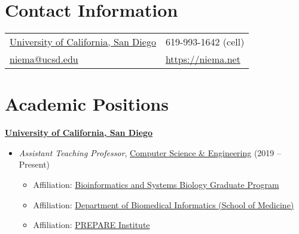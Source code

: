 \documentclass[margin,line]{res}
\begin{document}
\begin{resume}

\section{\sc Contact Information}
\vspace{.05in}
\begin{tabular}{@{}p{2.75in}p{2in}}
\href{http://www.ucsd.edu/}{University of California, San Diego} & 619-993-1642 (cell)\\
\href{mailto:niema@ucsd.edu}{niema@ucsd.edu} & \href{https://niema.net}{https://niema.net}\\
\end{tabular}

\section{\sc Academic Positions}
{\bf \href{http://www.ucsd.edu/}{University of California, San Diego}}\\
\vspace*{-.1in}
\begin{itemize}
\item[] \hspace*{-2mm} \textit{Assistant Teaching Professor}, \href{http://www.cs.ucsd.edu/}{Computer Science \& Engineering} (2019 -- Present)
\begin{itemize}
\item Affiliation: \href{http://bioinformatics.ucsd.edu/}{Bioinformatics and Systems Biology Graduate Program}
\item Affiliation: \href{http://dbmi.ucsd.edu/}{Department of Biomedical Informatics (School of Medicine)}
\item Affiliation: \href{https://prepare.ucsd.edu/}{PREPARE Institute}
\end{itemize}
\end{itemize}


\end{resume}
\end{document}
